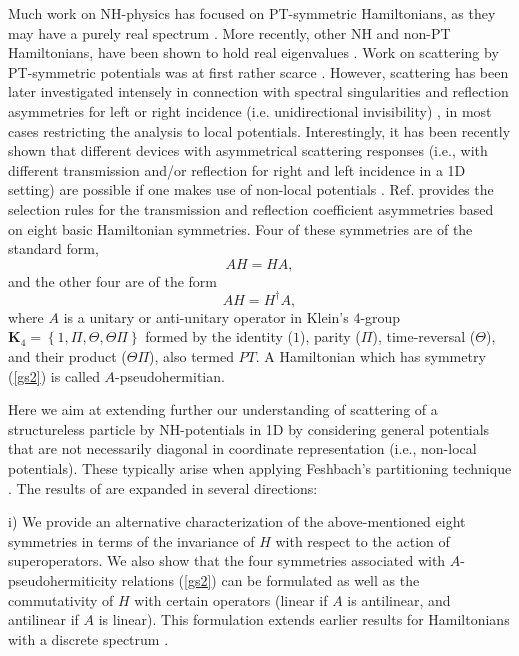 Much work on  NH-physics  has focused on PT-symmetric Hamiltonians, as they may have a purely real spectrum \cite{Bender1998}. More recently, other NH and non-PT Hamiltonians, have been shown to hold real eigenvalues \cite{Nixon2016,Chen2017,Yang2017}. Work on scattering by PT-symmetric potentials was at first rather scarce \cite{Muga2004,Ruschhaupt2005,Cannata2007,Znojil2015}. However, scattering has been later investigated intensely in connection with spectral singularities and reflection asymmetries for left or right incidence (i.e. unidirectional invisibility) \cite{Mostafazadeh2009,Longhi2014,Mostafazadeh2013}, in most cases restricting the analysis to local potentials. Interestingly, it has been recently shown  that different devices with asymmetrical scattering responses (i.e., with different transmission and/or reflection for right and left incidence in a 1D setting) are possible if one makes use of non-local potentials \cite{Ruschhaupt2017}. Ref. \cite{Ruschhaupt2017} provides the selection rules for the transmission and reflection coefficient asymmetries based on eight basic Hamiltonian symmetries. Four of these symmetries are of the standard form,
%
\begin{equation}
	AH=HA,
	\label{gs1}
\end{equation}
%
and the other four are of the form
%
\begin{equation}
	AH=H^\dagger A,
	\label{gs2}
\end{equation}
%
where $A$ is a unitary or anti-unitary operator in Klein's $4$-group \linebreak $\mathbf{K}_4 = \left\{1,\Pi,\Theta,\Theta\Pi\right\}$ formed by the identity ($1$), parity ($\Pi$), time-reversal ($\Theta$), and their product ($\Theta\Pi$), also termed $PT$. A Hamiltonian which has symmetry (\ref{gs2}) is called \linebreak $A$-pseudohermitian.


Here we aim at extending further our understanding of scattering of a structureless particle by NH-potentials in 1D
by considering general potentials that
are not necessarily diagonal in coordinate representation (i.e., non-local potentials).  These
typically arise when applying Feshbach's partitioning technique \cite{Ruschhaupt2004a}.
The results of \cite{Ruschhaupt2017} are expanded in several directions:

i) We provide an alternative characterization of the
above-mentioned eight symmetries in terms of the invariance of $H$ with respect to the action of superoperators. We also show that the four symmetries associated with $A$-pseudohermiticity relations (\ref{gs2}) can be formulated as well as the commutativity of $H$ with  certain operators
(linear if $A$ is antilinear, and antilinear if $A$ is linear). This formulation extends earlier results
for Hamiltonians with a discrete spectrum \cite{Mostafazadeh2002,Mostafazadeh2002b}.


